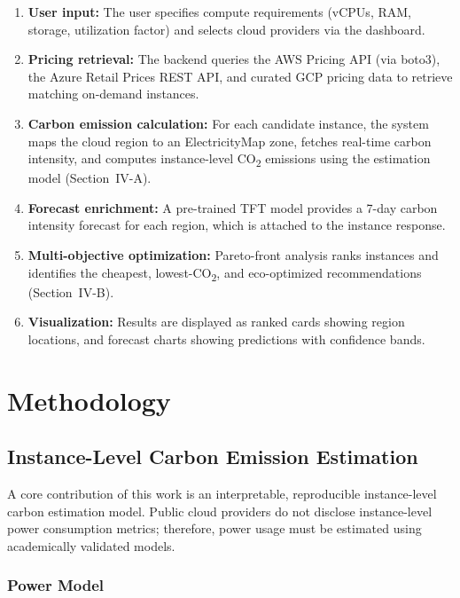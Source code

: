 \documentclass[conference]{IEEEtran}
\begin{document}
\begin{enumerate}
    \item \textbf{User input:} The user specifies compute requirements (vCPUs, RAM, storage, utilization factor) and selects cloud providers via the dashboard.
    \item \textbf{Pricing retrieval:} The backend queries the AWS Pricing API (via boto3), the Azure Retail Prices REST API, and curated GCP pricing data to retrieve matching on-demand instances.
    \item \textbf{Carbon emission calculation:} For each candidate instance, the system maps the cloud region to an ElectricityMap zone, fetches real-time carbon intensity, and computes instance-level CO\textsubscript{2} emissions using the estimation model (Section~IV-A).
    \item \textbf{Forecast enrichment:} A pre-trained TFT model provides a 7-day carbon intensity forecast for each region, which is attached to the instance response.
    \item \textbf{Multi-objective optimization:} Pareto-front analysis ranks instances and identifies the cheapest, lowest-CO\textsubscript{2}, and eco-optimized recommendations (Section~IV-B).
    \item \textbf{Visualization:} Results are displayed as ranked cards showing region locations, and forecast charts showing predictions with confidence bands.
\end{enumerate}

\section{Methodology}

\subsection{Instance-Level Carbon Emission Estimation}

A core contribution of this work is an interpretable, reproducible instance-level carbon estimation model. Public cloud providers do not disclose instance-level power consumption metrics; therefore, power usage must be estimated using academically validated models.

\subsubsection{Power Model}
\end{document}
